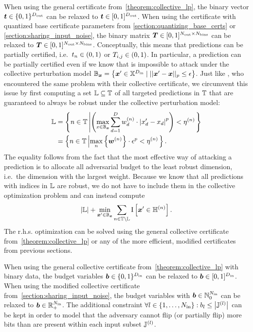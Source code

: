 When using the general certificate from~\autoref{theorem:collective_lp}, the binary vector ${\bm{t}} \in \{0,1\}^{D_\mathrm{out}}$ can be relaxed to 
${\bm{t}} \in [0,1]^{D_\mathrm{out}}$. When using the certificate with quantized base certificate parameters from \autoref{section:quantizing_base_certs} or \autoref{section:sharing_input_noise}, the binary matrix ${\bm{T}} \in [0,1]^{N_\mathrm{out} \times N_\mathrm{bins}}$ can be relaxed to ${\bm{T}} \in [0,1]^{N_\mathrm{out} \times N_\mathrm{bins}}$. Conceptually, this means that predictions can be partially certified, i.e.~${t}_n \in (0,1)$ or ${T}_{i,j} \in (0,1)$.
In particular, a prediction can be partially certified even if we know that is impossible to attack under the collective perturbation model ${\mathbb{B}}_{\bm{x}} = \left\{{\bm{x}}' \in {\mathbb{X}}^{D_\mathrm{in}} \mid ||{\bm{x}}' - {\bm{x}}||_p \leq \epsilon \right\}$.
Just like \citet{Schuchardt2021}, who encountered the same problem with their collective certificate, we circumvent this issue by first computing a set ${\mathbb{L}} \subseteq {\mathbb{T}}$ of all targeted predictions in ${\mathbb{T}}$ that are guaranteed to always be robust under the collective perturbation model:
\begin{align}
    {\mathbb{L}} &= \left\{
        n \in {\mathbb{T}} \left| 
            \left(
            \max_{x \in {\mathbb{B}}_{\bm{x}}}
            \sum_{d=1}^{D} {w}_d^{(n)} \cdot \left| {x}'_d - {x}_d \right|^p
            \right)
            < \eta^{(n)}
        \right.
    \right\}
    \\
    &= 
    \left\{
        n \in {\mathbb{T}} \left| 
            \max_n \left\{{\bm{w}}^{(n)} \right\}
            \cdot
            \epsilon^p
            < \eta^{(n)}
        \right.
    \right\}.
\end{align}
The equality follows from the fact that the most effective way of attacking a prediction is to allocate all adversarial budget to the least robust dimension, i.e.~the dimension with the largest weight.
Because we know that all predictions with indices in ${\mathbb{L}}$ are robust, we do not have to include them in the collective optimization problem and can instead compute
\begin{equation}
    | {\mathbb{L}} | + \min_{{\bm{x}}' \in {\mathbb{B}}_{\bm{x}}} \sum_{n \in {\mathbb{T}} \setminus {\mathbb{L}}} \mathrm{I}\left[{\bm{x}}' \in {\mathbb{H}}^{(n)} \right].
\end{equation}
The r.h.s. optimization can be solved using the general collective certificate from~\autoref{theorem:collective_lp} or any of the more efficient, modified certificates from previous sections.

When using the general collective certificate from~\autoref{theorem:collective_lp} with binary data, the budget variables ${\bm{b}} \in \{0,1\}^{D_\mathrm{in}}$ can be relaxed to
${\bm{b}} \in [0,1]^{D_\mathrm{in}}$.
When using the modified collective certificate from~\autoref{section:sharing_input_noise}, the budget variables with ${\bm{b}} \in {\mathbb{N}}_0^{N_\mathrm{in}}$ can be relaxed to ${\bm{b}} \in {\mathbb{R}}_+^{N_\mathrm{in}}$.
The additional constraint
$\forall l \in \{1,\dots,N_\mathrm{in}\} : {b}_l \leq \left| {\mathbb{J}}^{(l)} \right|$ can be kept in order to model that the adversary cannot flip (or partially flip) more bits than are present within each input subset ${\mathbb{J}}^{(l)}$.


